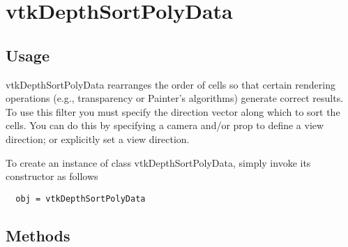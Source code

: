 \section{vtkDepthSortPolyData}

\subsection{Usage}

 vtkDepthSortPolyData rearranges the order of cells so that certain
 rendering operations (e.g., transparency or Painter's algorithms)
 generate correct results. To use this filter you must specify the
 direction vector along which to sort the cells. You can do this by 
 specifying a camera and/or prop to define a view direction; or 
 explicitly set a view direction.

To create an instance of class vtkDepthSortPolyData, simply
invoke its constructor as follows
\begin{verbatim}
  obj = vtkDepthSortPolyData
\end{verbatim}
\subsection{Methods}


